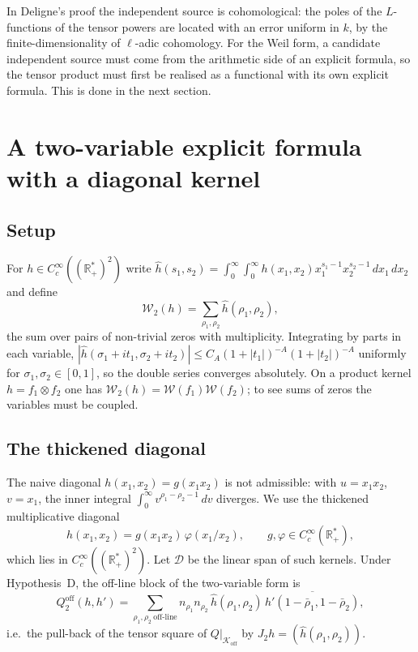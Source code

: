 \documentclass[11pt]{amsart}
\theoremstyle{definition}
\theoremstyle{remark}
\newcommand{\bbR}{\mathbb{R}}
\newcommand{\Rp}{\bbR_+^*}
\newcommand{\Koff}{\mathcal{K}_{\mathrm{off}}}
\newcommand{\Wtwo}{\mathcal{W}_2}
\newcommand{\Wcal}{\mathcal{W}}
\begin{document}
In Deligne's proof the independent source is cohomological: the poles of the $L$-functions of
the tensor powers are located with an error uniform in $k$, by the finite-dimensionality of
$\ell$-adic cohomology. For the Weil form, a candidate independent source must come from the
arithmetic side of an explicit formula, so the tensor product must first be realised as a
functional with its own explicit formula. This is done in the next section.

\section{A two-variable explicit formula with a diagonal kernel}\label{sec:experiment}

\subsection{Setup}
For $h\in C_c^\infty((\Rp)^2)$ write
$\hat h(s_1,s_2)=\int_0^\infty\!\int_0^\infty h(x_1,x_2)x_1^{s_1-1}x_2^{s_2-1}\,dx_1\,dx_2$ and
define
\[
\Wtwo(h)=\sum_{\rho_1,\rho_2}\hat h(\rho_1,\rho_2),
\]
the sum over pairs of non-trivial zeros with multiplicity. Integrating by parts in each variable,
$|\hat h(\sigma_1+it_1,\sigma_2+it_2)|\le C_A(1+|t_1|)^{-A}(1+|t_2|)^{-A}$ uniformly for
$\sigma_1,\sigma_2\in[0,1]$, so the double series converges absolutely. On a product kernel
$h=f_1\otimes f_2$ one has $\Wtwo(h)=\Wcal(f_1)\Wcal(f_2)$; to see sums of zeros the variables
must be coupled.

\subsection{The thickened diagonal}
The naive diagonal $h(x_1,x_2)=g(x_1x_2)$ is not admissible: with $u=x_1x_2$, $v=x_1$, the inner
integral $\int_0^\infty v^{\rho_1-\rho_2-1}\,dv$ diverges. We use the thickened multiplicative
diagonal
\begin{equation}\label{eq:thick}
h(x_1,x_2)=g(x_1x_2)\,\varphi(x_1/x_2),\qquad
g,\varphi\in C_c^\infty(\bbR_+^*),
\end{equation}
which lies in $C_c^\infty((\Rp)^2)$. Let $\mathcal D$ be the linear span of such kernels. Under
Hypothesis~D, the off-line block of the two-variable form is
\[
Q_2^{\mathrm{off}}(h,h')=\sum_{\rho_1,\rho_2\ \text{off-line}}n_{\rho_1}n_{\rho_2}\,
\hat h(\rho_1,\rho_2)\,\overline{\hat h'(1-\bar\rho_1,1-\bar\rho_2)},
\]
i.e.\ the pull-back of the tensor square of $Q|_{\Koff}$ by $J_2h=(\hat h(\rho_1,\rho_2))$.
\end{document}

